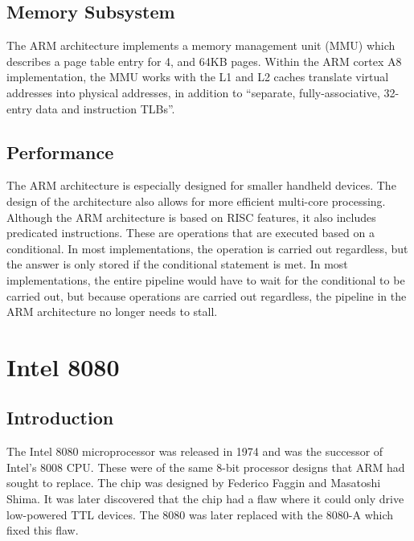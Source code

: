 \documentclass[draftclsnofoot, onecolumn, 10pt, compsoc]{IEEEtran}
\begin{document}
        \subsection{Memory Subsystem}
            The ARM architecture implements a memory management unit (MMU) which describes a page table entry for 4, and 64KB pages. Within the ARM cortex A8 implementation, the MMU works with the L1 and L2 caches translate virtual addresses into physical addresses, in addition to “separate, fully-associative, 32-entry data and instruction TLBs”.
            ~\cite{ARM:MMU}
            ~\cite{ARM:Memory}
        \subsection{Performance}
            The ARM architecture is especially designed for smaller handheld devices. The design of the architecture also allows for more efficient multi-core processing. Although the ARM architecture is based on RISC features, it also includes predicated instructions. These are operations that are executed based on a conditional. In most implementations, the operation is carried out regardless, but the answer is only stored if the conditional statement is met. In most implementations, the entire pipeline would have to wait for the conditional to be carried out, but because operations are carried out regardless, the pipeline in the ARM architecture no longer needs to stall. 
            ~\cite{ARM:All}
            ~\cite{ARM:Small}
        \newpage
        
    \section{Intel 8080}
            
        \subsection{Introduction}
            The Intel 8080 microprocessor was released in 1974 and was the successor of Intel’s 8008 CPU. These were of the same 8-bit processor designs that ARM had sought to replace. The chip was designed by Federico Faggin and Masatoshi Shima. It was later discovered that the chip had a flaw where it could only drive low-powered TTL devices. The 8080 was later replaced with the 8080-A which fixed this flaw. 
            ~\cite{8080:Intro}
\end{document}

